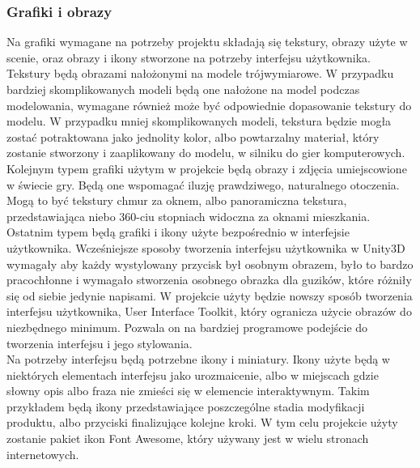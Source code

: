 \documentclass{article} %
\begin{document}
        \subsubsection{Grafiki i obrazy}
            Na grafiki wymagane na potrzeby projektu składają się tekstury, obrazy użyte w scenie, oraz obrazy i ikony stworzone na potrzeby interfejsu użytkownika. 
            \\
            
            Tekstury będą obrazami nałożonymi na modele trójwymiarowe. W przypadku bardziej skomplikowanych modeli będą one nałożone na model podczas modelowania, wymagane również może być odpowiednie dopasowanie tekstury do modelu. W przypadku mniej skomplikowanych modeli, tekstura będzie mogła zostać potraktowana jako jednolity kolor, albo powtarzalny materiał, który zostanie stworzony i zaaplikowany do modelu, w silniku do gier komputerowych.
            \\
            
            Kolejnym typem grafiki użytym w projekcie będą obrazy i zdjęcia umiejscowione w świecie gry. Będą one wspomagać iluzję prawdziwego, naturalnego otoczenia. Mogą to być tekstury chmur za oknem, albo panoramiczna tekstura, przedstawiająca niebo 360-ciu stopniach widoczna za oknami mieszkania.
            \\
            
            Ostatnim typem będą grafiki i ikony użyte bezpośrednio w interfejsie użytkownika. Wcześniejsze sposoby tworzenia interfejsu użytkownika w Unity3D wymagały aby każdy wystylowany przycisk był osobnym obrazem, było to bardzo pracochłonne i wymagało stworzenia osobnego obrazka dla guzików, które różniły się od siebie jedynie napisami. W projekcie użyty będzie nowszy sposób tworzenia interfejsu użytkownika, User Interface Toolkit, który ogranicza użycie obrazów do niezbędnego minimum. Pozwala on na bardziej programowe podejście do tworzenia interfejsu i jego stylowania.
            \\
            
            Na potrzeby interfejsu będą potrzebne ikony i miniatury. Ikony użyte będą w niektórych elementach interfejsu jako urozmaicenie, albo w miejscach gdzie słowny opis albo fraza nie zmieści się w elemencie interaktywnym. Takim przykładem będą ikony przedstawiające poszczególne stadia modyfikacji produktu, albo przyciski finalizujące kolejne kroki. W tym celu projekcie użyty zostanie pakiet ikon Font Awesome, który używany jest w wielu stronach internetowych.
            \\
        
\end{document}
